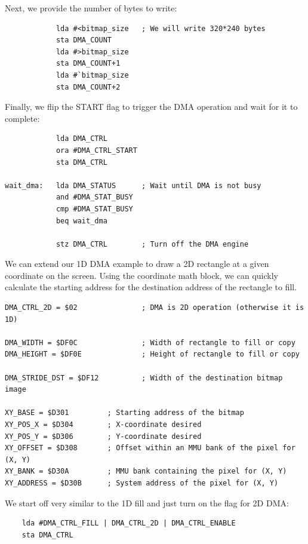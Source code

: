 Next, we provide the number of bytes to write:

\begin{verbatim}
            lda #<bitmap_size   ; We will write 320*240 bytes
            sta DMA_COUNT
            lda #>bitmap_size
            sta DMA_COUNT+1
            lda #`bitmap_size
            sta DMA_COUNT+2
\end{verbatim}

Finally, we flip the START flag to trigger the DMA operation and wait for it to complete:

\begin{verbatim}
            lda DMA_CTRL
            ora #DMA_CTRL_START
            sta DMA_CTRL

wait_dma:   lda DMA_STATUS      ; Wait until DMA is not busy
            and #DMA_STAT_BUSY
            cmp #DMA_STAT_BUSY
            beq wait_dma

            stz DMA_CTRL        ; Turn off the DMA engine
\end{verbatim}

\label{ex:dma_2d}

We can extend our 1D DMA example to draw a 2D rectangle at a given coordinate on the screen. Using the coordinate math block, we can quickly calculate the starting address for the destination address of the rectangle to fill.

\begin{verbatim}
DMA_CTRL_2D = $02               ; DMA is 2D operation (otherwise it is 1D)

DMA_WIDTH = $DF0C               ; Width of rectangle to fill or copy
DMA_HEIGHT = $DF0E              ; Height of rectangle to fill or copy

DMA_STRIDE_DST = $DF12          ; Width of the destination bitmap image

XY_BASE = $D301         ; Starting address of the bitmap
XY_POS_X = $D304        ; X-coordinate desired
XY_POS_Y = $D306        ; Y-coordinate desired
XY_OFFSET = $D308       ; Offset within an MMU bank of the pixel for (X, Y)
XY_BANK = $D30A         ; MMU bank containing the pixel for (X, Y)
XY_ADDRESS = $D30B      ; System address of the pixel for (X, Y)
\end{verbatim}

We start off very similar to the 1D fill and just turn on the flag for 2D DMA:
\begin{verbatim}
    lda #DMA_CTRL_FILL | DMA_CTRL_2D | DMA_CTRL_ENABLE
    sta DMA_CTRL
\end{verbatim}

